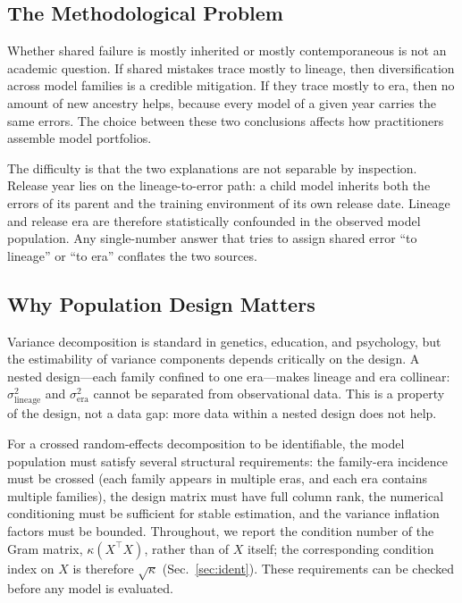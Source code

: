 \documentclass{ieeeaccess}
\theoremstyle{definition}
\theoremstyle{plain}
\begin{document}
\subsection{The Methodological Problem}
Whether shared failure is mostly inherited or mostly contemporaneous is not an academic question. If shared mistakes trace mostly to lineage, then diversification across model families is a credible mitigation. If they trace mostly to era, then no amount of new ancestry helps, because every model of a given year carries the same errors. The choice between these two conclusions affects how practitioners assemble model portfolios.

The difficulty is that the two explanations are not separable by inspection. Release year lies on the lineage-to-error path: a child model inherits both the errors of its parent and the training environment of its own release date. Lineage and release era are therefore statistically confounded in the observed model population. Any single-number answer that tries to assign shared error ``to lineage'' or ``to era'' conflates the two sources.

\subsection{Why Population Design Matters}
Variance decomposition is standard in genetics, education, and psychology, but the estimability of variance components depends critically on the design. A nested design---each family confined to one era---makes lineage and era collinear: $\sigma^2_{\text{lineage}}$ and $\sigma^2_{\text{era}}$ cannot be separated from observational data. This is a property of the design, not a data gap: more data within a nested design does not help.

For a crossed random-effects decomposition to be identifiable, the model population must satisfy several structural requirements: the family-era incidence must be crossed (each family appears in multiple eras, and each era contains multiple families), the design matrix must have full column rank, the numerical conditioning must be sufficient for stable estimation, and the variance inflation factors must be bounded. Throughout, we report the condition number of the Gram matrix, $\kappa(X^\top X)$, rather than of $X$ itself; the corresponding condition index on $X$ is therefore $\sqrt{\kappa}$ (Sec.~\ref{sec:ident}). These requirements can be checked before any model is evaluated.
\end{document}
